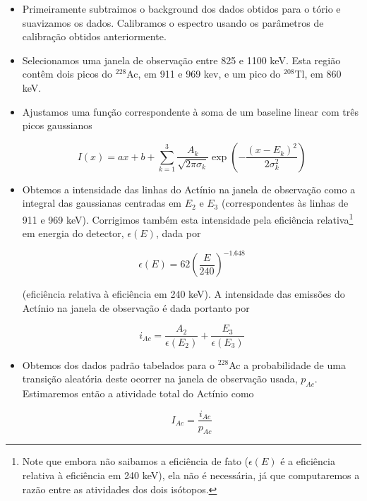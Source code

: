 \documentclass[a4paper, 11pt, notitlepage]{article}
\numberwithin{equation}{section}  %
\begin{document}
\begin{itemize}
 \item Primeiramente subtraimos o background dos dados obtidos para o tório e suavizamos os dados. Calibramos o espectro usando os parâmetros de calibração obtidos anteriormente.
 \item Selecionamos uma janela de observação entre 825 e 1100 keV. Esta região contêm dois picos do ${}^{228}$Ac, em 911 e 969 kev, e um pico do ${}^{208}$Tl, em 860 keV.
 \item Ajustamos uma função correspondente à soma de um baseline linear com três picos gaussianos

\begin{equation}
I(x) = ax + b + \sum_{k=1}^{3} \frac{A_k}{\sqrt{2\pi \sigma_k}} \exp\left(-\frac{(x - E_k)^2}{2\sigma_k^2}\right) \label{eq:tres.picos}
\end{equation}

 \item Obtemos a intensidade das linhas do Actínio na janela de observação como a integral das gaussianas centradas em $E_2$ e $E_3$ (correspondentes às linhas de 911 e 969 keV). Corrigimos também esta intensidade pela eficiência relativa\footnote{Note que embora não saibamos a eficiência de fato ($\epsilon(E)$ é a eficiência relativa à eficiência em 240 keV), ela não é necessária, já que computaremos a razão entre as atividades dos dois isótopos.} em energia do detector, $\epsilon(E)$, dada por

\begin{equation}
\epsilon(E) = 62 \left(\frac{E}{240}\right)^{-1.648} \label{eq:eficiencia}
\end{equation}

\noindent (eficiência relativa à eficiência em 240 keV). A intensidade das emissões do Actínio na janela de observação é dada portanto por

\begin{equation} i_{Ac} = \frac{A_2}{\epsilon(E_2)} + \frac{E_3}{\epsilon(E_3)}  \label{eq:i_Ac}
\end{equation}

 \item Obtemos dos dados padrão tabelados para o ${}^{228}$Ac a probabilidade de uma transição aleatória deste ocorrer na janela de observação usada, $p_{Ac}$. Estimaremos então a atividade total do Actínio como

\begin{equation}
 I_{Ac} = \frac{i_{Ac}}{p_{Ac}}  \label{eq:I_Ac}
\end{equation}


\end{itemize}
\end{document}
